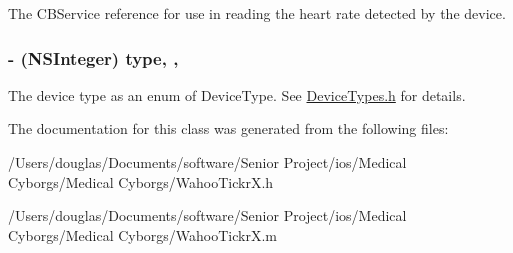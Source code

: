 The C\-B\-Service reference for use in reading the heart rate detected by the device. \hypertarget{interface_wahoo_tickr_x_a96e73fccf071a4f3406e51a833a4756a}{
\subsubsection[{type}]{\setlength{\rightskip}{0pt plus 5cm}-\/ (N\-S\-Integer) type\hspace{0.3cm}{\ttfamily [read]}, {\ttfamily [write]}, {\ttfamily [atomic]}}}\label{interface_wahoo_tickr_x_a96e73fccf071a4f3406e51a833a4756a}
The device type as an enum of Device\-Type. See \hyperlink{_device_types_8h_source}{Device\-Types.\-h} for details. 

The documentation for this class was generated from the following files\-:\begin{DoxyCompactItemize}
\item 
/\-Users/douglas/\-Documents/software/\-Senior Project/ios/\-Medical Cyborgs/\-Medical Cyborgs/Wahoo\-Tickr\-X.\-h\item 
/\-Users/douglas/\-Documents/software/\-Senior Project/ios/\-Medical Cyborgs/\-Medical Cyborgs/Wahoo\-Tickr\-X.\-m\end{DoxyCompactItemize}
